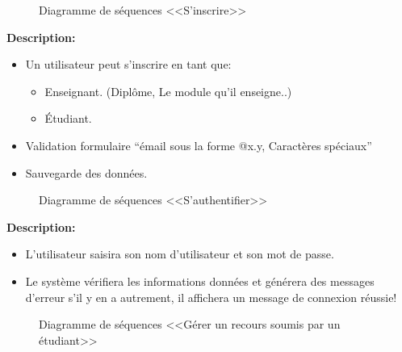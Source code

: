 \documentclass[12pt]{report}
\begin{document}
\begin{figure}[h]
\centering
    \caption{Diagramme de séquences <<S'inscrire>>}
\end{figure}

\textbf{Description:}

\begin{itemize}
    \item Un utilisateur peut s'inscrire en tant que:
    \begin{itemize}
        \item Enseignant. (Diplôme, Le module qu'il enseigne..)
        \item Étudiant.
    \end{itemize}
    \item Validation formulaire ``émail sous la forme @x.y, Caractères spéciaux''
    \item Sauvegarde des données.
\end{itemize}

\newpage

\begin{figure}[h]
\centering
    \caption{Diagramme de séquences <<S'authentifier>>}
\end{figure}

\vspace{0.3in}

\textbf{Description:}

\begin{itemize}
    \item L'utilisateur saisira son nom d'utilisateur et son mot de passe.
    \item Le système vérifiera les informations données et générera des messages d'erreur s'il y en a autrement, il affichera un message de connexion réussie!
\end{itemize}

\newpage

\begin{figure}[h]
\centering
    \caption{Diagramme de séquences <<Gérer un recours soumis par un étudiant>>}
\end{figure}
\end{document}
